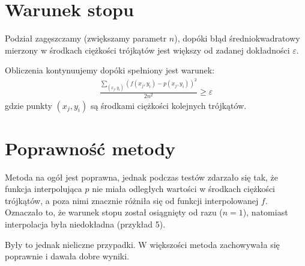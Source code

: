 \documentclass[12pt]{article}
\begin{document}
	\section{Warunek stopu}
	Podział zagęszczamy (zwiększamy parametr $n$), dopóki błąd średniokwadratowy mierzony w środkach ciężkości trójkątów jest większy od zadanej dokładności $\varepsilon$.
	
	Obliczenia kontynuujemy dopóki spełniony jest warunek:
	\begin{align*}
		\frac{\sum_{(x_j, y_i)} (f(x_j, y_i) - p(x_j, y_i))^2}{2n^2} \geq \varepsilon
	\end{align*}
	gdzie punkty $(x_j, y_i)$ są środkami ciężkości kolejnych trójkątów.
	
	\section{Poprawność metody}
	Metoda na ogół jest poprawna, jednak podczas testów zdarzało się tak, że funkcja interpolująca $p$ nie miała odległych wartości w środkach ciężkości trójkątów, a poza nimi znacznie różniła się od funkcji interpolowanej $f$. Oznaczało to, że warunek stopu został osiągnięty od razu ($n = 1$), natomiast interpolacja była niedokładna (przykład 5).
	
	Były to jednak nieliczne przypadki. W większości metoda zachowywała się poprawnie i dawała dobre wyniki.
	
\end{document}
